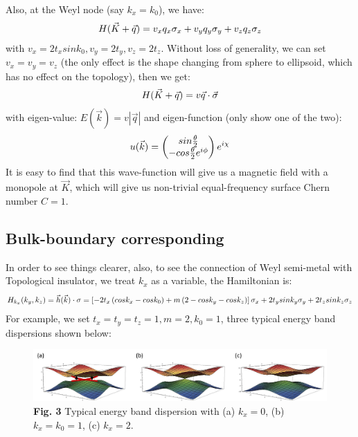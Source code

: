 \documentclass[letterpaper,10pt,english]{sphinxmanual}
\begin{document}
Also, at the Weyl node (say \(k_x=k_0\)), we have:
\begin{gather}
\begin{split}H(\vec{K}+\vec{q})=v_xq_x\sigma_x+v_yq_y\sigma_y+v_zq_z\sigma_z\end{split}\notag
\end{gather}
with \(v_x=2t_xsink_0,v_y=2t_y,v_z=2t_z\). Without loss of generality, we can set \(v_x=v_y=v_z\) (the only effect is the shape changing from sphere to ellipsoid, which has no effect on the topology), then we get:
\begin{gather}
\begin{split}H(\vec{K}+\vec{q})=v\vec{q}\cdot\vec{\sigma}\end{split}\notag
\end{gather}
with eigen-value: \(E(\vec{k})=v|\vec{q}|\) and eigen-function (only show one of the two):
\begin{gather}
\begin{split}u(\vec{k})=\begin{pmatrix}sin\frac{\theta}{2}\\-cos\frac{\theta}{2}e^{i\phi}\end{pmatrix}e^{i\chi}\end{split}\notag
\end{gather}
It is easy to find that this wave-function will give us a magnetic field with a monopole at \(\vec{K}\), which will give us non-trivial equal-frequency surface Chern number \(C=1\).


\subsection{Bulk-boundary corresponding}
\label{TI/Weyl_semi-metal:bulk-boundary-corresponding}
In order to see things clearer, also, to see the connection of Weyl semi-metal with Topological insulator, we treat \(k_x\) as a variable, the Hamiltonian is:
\begin{gather}
\begin{split}H_{k_x}(k_y,k_z)=\vec{h}(\vec{k})\cdot\sigma=\left[-2t_x\left(cosk_x-cosk_0\right)+m\left(2-cosk_y-cosk_z\right)\right]\sigma_x+2t_ysink_y\sigma_y+2t_zsink_z\sigma_z\end{split}\notag
\end{gather}
For example, we set \(t_x=t_y=t_z=1,m=2,k_0=1\), three typical energy band dispersions shown below:
\begin{figure}[htbp]
\centering
\capstart

\includegraphics[width=0.800\linewidth]{31.png}
\caption{\textbf{Fig. 3} Typical energy band dispersion with (a) \(k_x=0\), (b) \(k_x=k_0=1\), (c) \(k_x=2\).}\end{figure}
\end{document}
